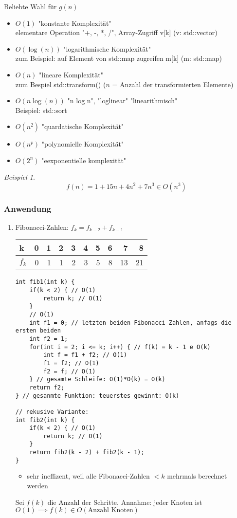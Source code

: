 \documentclass[a4paper]{scrartcl}
\theoremstyle{definition}
\theoremstyle{plain}
\theoremstyle{remark}
\theoremstyle{remark}
\newtheorem{ex}{Beispiel}
\begin{document}
Beliebte Wahl für $g(n)$
\begin{itemize}
\item $O(1)$ \hfill "konstante Komplexität" \\
      elementare Operation "+, -, *, /", Array-Zugriff v[k] (v: std::vector)
\item $O(\log(n))$ \hfill "logarithmische Komplexität" \\
      zum Beispiel: auf Element von std::map zugreifen m[k] (m: std::map)
\item $O(n)$ \hfill "lineare Komplexität" \\
      zum Bespiel std::transform() ($n$ = Anzahl der transformierten Elemente)
\item $O(n \log(n))$ \hfill{"n log n", "loglinear" "linearithmisch"} \\
      Beispiel: std::sort
\item $O(n^2)$ \hfill "quardatische Komplexität"
\item $O(n^p)$ \hfill "polynomielle Komplexität"
\item $O(2^n)$ \hfill "eexponentielle komplexität"
\end{itemize}
\begin{ex}
\[f(n) = 1 + 15 n + 4n^2 + 7n^3 \in O(n^3)\]
\end{ex}
\subsubsection{Anwendung}
\label{sec-15-1-3}
\begin{enumerate}
\item Fibonacci-Zahlen: $f_k = f_{k - 2} + f_{k - 1}$
\begin{center}
\begin{tabular}{lrrrrrrrrr}
k & 0 & 1 & 2 & 3 & 4 & 5 & 6 & 7 & 8\\
\hline
$f_k$ & 0 & 1 & 1 & 2 & 3 & 5 & 8 & 13 & 21\\
\end{tabular}
\end{center}
\begin{verbatim}
int fib1(int k) {
	if(k < 2) { // O(1)
		return k; // O(1)
	}
	// O(1)
	int f1 = 0; // letzten beiden Fibonacci Zahlen, anfags die ersten beiden
	int f2 = 1;
	for(int i = 2; i <= k; i++) { // f(k) = k - 1 e O(k)
		int f = f1 + f2; // O(1)
		f1 = f2; // O(1)
		f2 = f; // O(1)
	} // gesamte Schleife: O(1)*O(k) = O(k)
	return f2;
} // gesanmte Funktion: teuerstes gewinnt: O(k)

// rekusive Variante:
int fib2(int k) {
	if(k < 2) { // O(1)
		return k; // O(1)
	}
	return fib2(k - 2) + fib2(k - 1);
}
\end{verbatim}
\begin{itemize}
\item sehr ineffizent, weil alle Fibonacci-Zahlen $< k$  mehrmals berechnet werden
\end{itemize}
Sei $f(k)$  die Anzahl der Schritte, Annahme: jeder Knoten ist $O(1) \implies f(k) \in O(\text{Anzahl Knoten})$
\end{enumerate}
\end{document}

